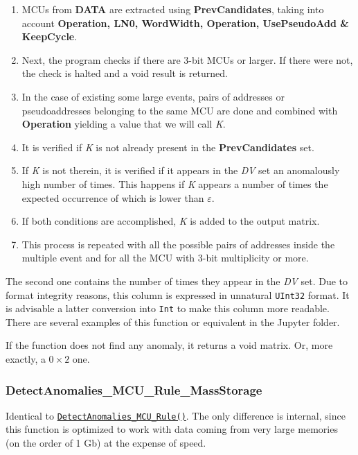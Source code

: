 \begin{itemize}
 	\begin{enumerate}
 		\item MCUs from \textbf{DATA} are extracted using \textbf{PrevCandidates}, taking into account \textbf{Operation, LN0, WordWidth, Operation, UsePseudoAdd \& KeepCycle}.
 		\item Next, the program checks if there are 3-bit MCUs or larger. If there were not, the check is halted and a void result is returned.
 		\item In the case of existing some large events, pairs of addresses or pseudoaddresses belonging to the same MCU are done and combined with \textbf{Operation} yielding a value that we will call  \textit{K}.
 		\item It is verified if \textit{K} is not already present in the \textbf{PrevCandidates} set.
 		\item If \textit{K} is not therein, it is verified if it appears in the \textit{DV} set an anomalously high number of times. This happens if \textit{K} appears a number of times the expected occurrence of which is lower than \textbf{\(\varepsilon\)}.
 		\item If both conditions are accomplished, \textit{K} is added to the output matrix.
 		\item This process is repeated with all the possible pairs of addresses inside the multiple event and for all the MCU with 3-bit multiplicity or more.
 	\end{enumerate}
 	
 	The second one contains the number of times they appear in the \textit{DV} set. Due to format integrity reasons, this column is expressed in unnatural \texttt{UInt32} format. It is advisable a latter conversion into \texttt{Int} to make this column more readable. There are several examples of this function or equivalent in the Jupyter folder.
 	
 	If the function does not find any anomaly, it returns a void matrix.  Or, more exactly, a \(0\times 2\) one.
 	
 \end{itemize}
 \subsubsection*{DetectAnomalies\_MCU\_Rule\_MassStorage}\label{Fun:DetectAnomaliesMCURule_MassStorage}
 Identical to \hyperref[Fun:DetectAnomaliesMCURule]{\texttt{DetectAnomalies\_MCU\_Rule()}}. The only difference is internal, since this function is optimized to work with data coming from very large memories (on the order of 1 Gb) at the expense of speed. 
